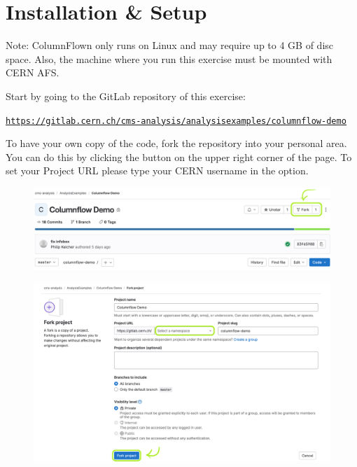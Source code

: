 \section{Installation \& Setup}
\justifying
\begin{tcolorbox}[colback=green!5!white,colframe=green!75!black,width=\textwidth]
Note: ColumnFlown only runs on Linux and may require up to 4 GB of disc space. \tcblower
Also, the machine where you run this exercise must be mounted with CERN AFS.
\end{tcolorbox}

Start by going to the GitLab repository of this exercise: 

\texttt{\textcolor{LimeGreen}{\href{https://gitlab.cern.ch/cms-analysis/analysisexamples/columnflow-demo}{\underline{https://gitlab.cern.ch/cms-analysis/analysisexamples/columnflow-demo}}}}

To have your own copy of the code, fork the repository into your personal area. You can do this by clicking the  button on the upper right corner of the page. To set your Project URL please type your CERN username in the  option. 

\begin{figure}[!h]
    \centering
    \includegraphics[scale=0.62]{images/gitlab.png}
\end{figure}
\begin{figure}[!h]
    \centering
    \includegraphics[scale=0.62]{images/fork1.png}
\end{figure}

